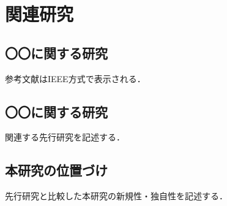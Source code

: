 \chapter{関連研究}

\section{〇〇に関する研究}

参考文献はIEEE方式で表示される\cite{sample2024}．

\section{〇〇に関する研究}

関連する先行研究を記述する．

\section{本研究の位置づけ}

先行研究と比較した本研究の新規性・独自性を記述する．

